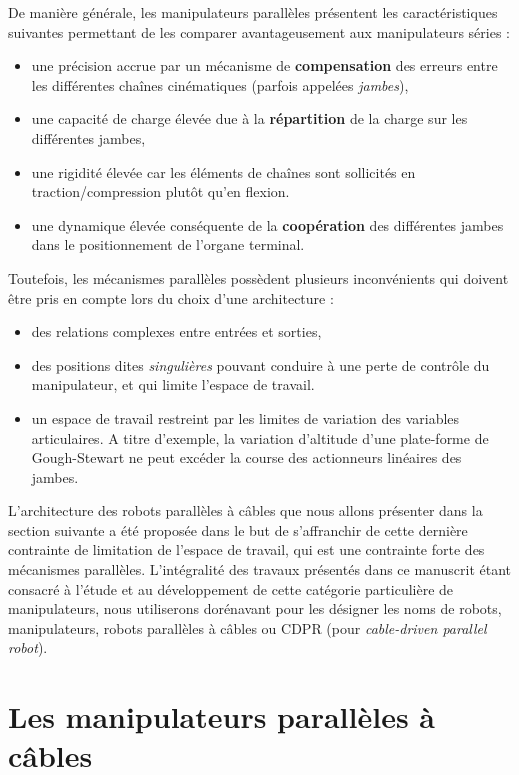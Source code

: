 De manière générale, les manipulateurs parallèles présentent les 
caractéristi\-ques sui\-vantes permettant de les comparer avantageusement aux 
manipulateurs séries :
\begin{itemize}
 \item une précision accrue par un mécanisme de {\bf compensation} des erreurs 
entre les différentes chaînes cinématiques (parfois appelées {\it jambes}),
 \item une capacité de charge élevée due à la {\bf répartition} de la charge sur 
les différentes jambes,
 \item une rigidité élevée car les éléments de chaînes sont sollicités en 
traction/compression plutôt qu'en flexion.
 \item une dynamique élevée conséquente de la {\bf coopération} des différentes 
jam\-bes dans le positionnement de l'organe terminal.
\end{itemize}

Toutefois, les mécanismes parallèles possèdent plusieurs inconvénients qui 
doivent être pris en compte lors du choix d'une architecture :
\begin{itemize}
 \item des relations complexes entre entrées et sorties,
 \item des positions dites {\it singulières} pouvant conduire à une perte de 
contrôle du manipulateur, et qui limite l'espace de travail.
 \item un espace de travail restreint par les limites de variation des 
variables articulaires. A titre d'exemple, la variation d'altitude d'une 
plate-forme de Gough-Stewart ne peut excéder la course des actionneurs 
linéaires des jambes.
\end{itemize}

L'architecture des robots parallèles à c\^ables que nous allons présenter dans 
la section suivante a été proposée dans le but de s'affranchir de cette dernière 
contrainte de limitation de l'espace de travail, qui est une contrainte forte 
des mécanismes parallèles.  L'intégralité des travaux présentés dans ce 
manuscrit étant consacré à l'étude et au développement de cette catégorie 
particulière de manipulateurs, nous utiliserons dorénavant pour les désigner les 
noms de robots, manipulateurs, robots parallèles à câbles ou CDPR (pour {\it 
cable-driven parallel robot}).

\section{Les manipulateurs parallèles à câbles} \label{chap0-1}


